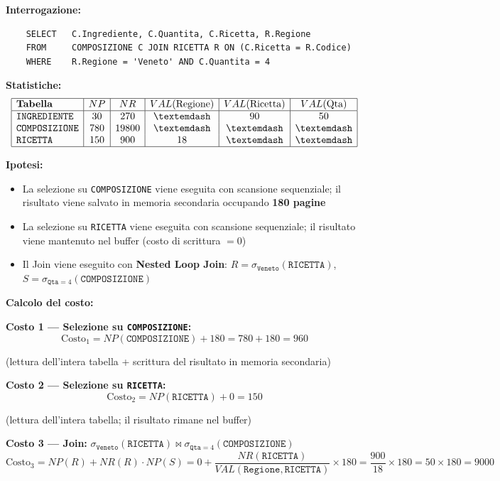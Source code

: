 \bigskip
\noindent\textbf{Interrogazione:}
\begin{verbatim}
	SELECT   C.Ingrediente, C.Quantita, C.Ricetta, R.Regione
	FROM     COMPOSIZIONE C JOIN RICETTA R ON (C.Ricetta = R.Codice)
	WHERE    R.Regione = 'Veneto' AND C.Quantita = 4
\end{verbatim}

\bigskip
\noindent\textbf{Statistiche:}
\[
\begin{array}{|l|c|c|c|c|c|}
	\hline
	\textbf{Tabella} & NP & NR & VAL(\text{Regione}) & VAL(\text{Ricetta}) & VAL(\text{Qta}) \\
	\hline
	\texttt{INGREDIENTE}  & 30  & 270   & —  & 90 & 50 \\
	\texttt{COMPOSIZIONE} & 780 & 19800 & —  & —  & —  \\
	\texttt{RICETTA}      & 150 & 900   & 18 & —  & —  \\
	\hline
\end{array}
\]

\bigskip
\noindent\textbf{Ipotesi:}
\begin{itemize}
	\item La selezione su \texttt{COMPOSIZIONE} viene eseguita con scansione sequenziale; il risultato viene salvato in memoria secondaria occupando \textbf{180 pagine}
	\item La selezione su \texttt{RICETTA} viene eseguita con scansione sequenziale; il risultato viene mantenuto nel buffer (costo di scrittura $= 0$)
	\item Il Join viene eseguito con \textbf{Nested Loop Join}: $R = \sigma_{\texttt{Veneto}}(\texttt{RICETTA})$, $S = \sigma_{\texttt{Qta}=4}(\texttt{COMPOSIZIONE})$
\end{itemize}

\bigskip
\noindent\textbf{Calcolo del costo:}

\bigskip
\noindent\textbf{Costo 1 — Selezione su \texttt{COMPOSIZIONE}:}
\[
\text{Costo}_1 = NP(\texttt{COMPOSIZIONE}) + 180 = 780 + 180 = 960
\]

\noindent (lettura dell'intera tabella + scrittura del risultato in memoria secondaria)

\bigskip
\noindent\textbf{Costo 2 — Selezione su \texttt{RICETTA}:}
\[
\text{Costo}_2 = NP(\texttt{RICETTA}) + 0 = 150
\]

\noindent (lettura dell'intera tabella; il risultato rimane nel buffer)

\bigskip
\noindent\textbf{Costo 3 — Join:} $\sigma_{\texttt{Veneto}}(\texttt{RICETTA}) \bowtie \sigma_{\texttt{Qta}=4}(\texttt{COMPOSIZIONE})$
\[
\text{Costo}_3 = NP(R) + NR(R) \cdot NP(S)
= 0 + \frac{NR(\texttt{RICETTA})}{VAL(\texttt{Regione},\texttt{RICETTA})} \times 180
= \frac{900}{18} \times 180 = 50 \times 180 = 9000
\]

